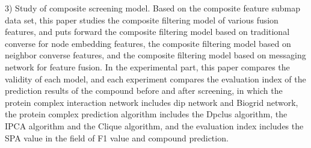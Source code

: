 \begin{eabstract}
  3) Study of composite screening model. Based on the composite feature submap data set, this paper studies the composite filtering model of various fusion features, and puts forward the composite filtering model based on traditional converse for node embedding features, the composite filtering model based on neighbor converse features, and the composite filtering model based on messaging network for feature fusion. In the experimental part, this paper compares the validity of each model, and each experiment compares the evaluation index of the prediction results of the compound before and after screening, in which the protein complex interaction network includes dip network and Biogrid network, the protein complex prediction algorithm includes the Dpclus algorithm, the IPCA algorithm and the Clique algorithm, and the evaluation index includes the SPA value in the field of F1 value and compound prediction.

\end{eabstract}

